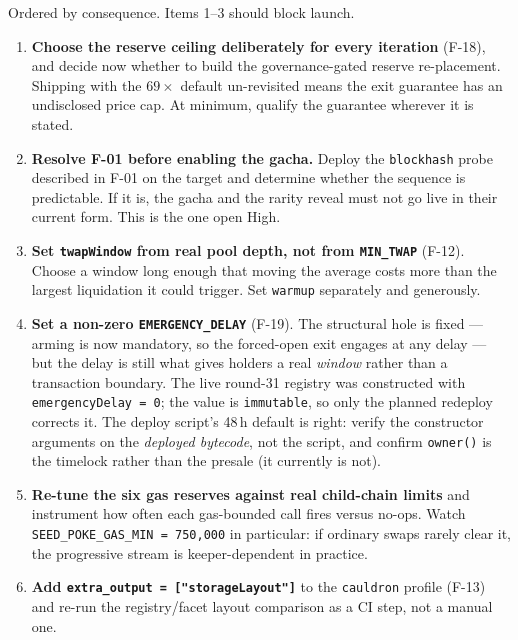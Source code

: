 \documentclass[11pt,a4paper]{article}
\newcommand{\code}[1]{\texttt{\small #1}}
\begin{document}
Ordered by consequence. Items 1--3 should block launch.

\begin{enumerate}[leftmargin=2em]
\item \textbf{Choose the reserve ceiling deliberately for every iteration}
(F-18), and decide now whether to build the governance-gated reserve re-placement.
Shipping with the $69\times$ default un-revisited means the exit guarantee has an
undisclosed price cap. At minimum, qualify the guarantee wherever it is stated.

\item \textbf{Resolve F-01 before enabling the gacha.} Deploy the
\code{blockhash} probe described in F-01 on the target and determine whether the
sequence is predictable. If it is, the gacha and the rarity reveal must not go
live in their current form. This is the one open High.

\item \textbf{Set \code{twapWindow} from real pool depth, not from
\code{MIN\_TWAP}} (F-12). Choose a window long enough that moving the average
costs more than the largest liquidation it could trigger. Set \code{warmup}
separately and generously.

\item \textbf{Set a non-zero \code{EMERGENCY\_DELAY}} (F-19). The structural hole
is fixed --- arming is now mandatory, so the forced-open exit engages at any delay
--- but the delay is still what gives holders a real \emph{window} rather than a
transaction boundary. The live round-31 registry was constructed with
\code{emergencyDelay = 0}; the value is \code{immutable}, so only the planned
redeploy corrects it. The deploy script's 48\,h default is right: verify the
constructor arguments on the \emph{deployed bytecode}, not the script, and confirm
\code{owner()} is the timelock rather than the presale (it currently is not).

\item \textbf{Re-tune the six gas reserves against real child-chain limits} and
instrument how often each gas-bounded call fires versus no-ops. Watch
\code{SEED\_POKE\_GAS\_MIN = 750{,}000} in particular: if ordinary swaps rarely
clear it, the progressive stream is keeper-dependent in practice.

\item \textbf{Add \code{extra\_output = ["storageLayout"]}} to the \code{cauldron}
profile (F-13) and re-run the registry/facet layout comparison as a CI step, not a
manual one.


\end{enumerate}
\end{document}
